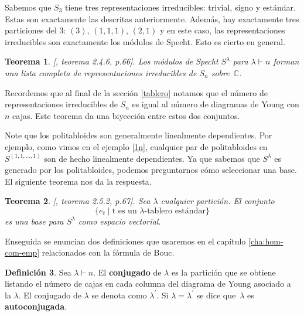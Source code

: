 \documentclass[12pt]{book}
\newtheorem{theorem}{Teorema}[section]
\newtheorem{corollary}[theorem]{Corolario}
\theoremstyle{definition}
\newtheorem{definition}[theorem]{Definición}
\newcounter{in}
\newcounter{ini}
\begin{document}
Sabemos que $S_{3}$ tiene tres representaciones irreducibles: trivial,
signo y estándar. Estas son exactamente las descritas anteriormente. Además,
hay exactamente tres particiones del $3$: $(3)$, $(1,1,1)$,
$(2,1)$ y en este caso, las representaciones irreducibles son
exactamente los módulos de Specht. Esto es cierto en general.

\begin{theorem}{[\cite{sagan2001symmetric}, teorema 2.4.6, p.66]}.
  Los módulos de Specht $S^{\lambda}$ para $\lambda\vdash n$ forman
  una lista completa de representaciones irreducibles de $S_{n}$ sobre~$\mathbb{C}$.
  \label{todas-repr-irre}
\end{theorem}
Recordemos que al final de la sección \ref{tablero} notamos que el
número de representaciones irreducibles de $S_{n}$ es igual al número
de diagramas de Young con $n$ cajas. Este teorema da una biyección
entre estos dos conjuntos.

Note que los politabloides son generalmente linealmente dependientes. Por
ejemplo, como vimos en el ejemplo \ref{1n}, cualquier par de
politabloides en $S^{(1,1,\ldots,1)}$ son de hecho linealmente
dependientes. Ya que sabemos que $S^{\lambda}$ es generado por los
politabloides, podemos preguntarnos cómo seleccionar una base. El
siguiente teorema nos da la respuesta.

\begin{theorem}{[\cite{sagan2001symmetric}, teorema 2.5.2, p.67]}.
  \label{base-S}
  Sea $\lambda$ cualquier partición. El conjunto
  \begin{equation*}
    \{e_{t}\mid \mbox{t es un $\lambda$-tablero estándar}\}
  \end{equation*}
  es una base para $S^{\lambda}$ como espacio vectorial.
\end{theorem}
Enseguida se enuncian dos definiciones que usaremos en el capítulo \ref{cha:hom-com-emp}
relacionados con la fórmula de Bouc.

\begin{definition}
  Sea $\lambda\vdash n$. El \textbf{conjugado} de $\lambda$ es la
  partición que se obtiene listando el número de cajas en cada columna
  del diagrama de Young asociado a la $\lambda$. El conjugado de
  $\lambda$ se denota como $\lambda^{'}$. Si $\lambda=\lambda^{'}$ se
  dice que~$\lambda$ es \textbf{autoconjugada}.
\end{definition}
\end{document}
